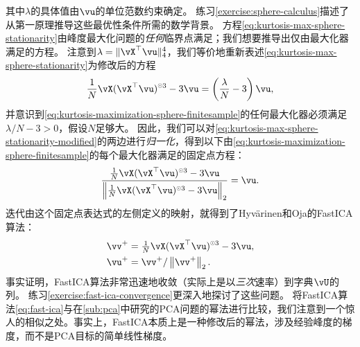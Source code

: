 \documentclass[../../book-main.tex]{subfiles}
\begin{document}
其中$\lambda$的具体值由$\vu$的单位范数约束确定。
练习\ref{exercise:sphere-calculus}描述了从第一原理推导这些最优性条件所需的数学背景。
方程\eqref{eq:kurtosis-max-sphere-stationarity}由峰度最大化问题的\textit{任何}临界点满足；我们想要推导出仅由最大化器满足的方程。
注意到$\lambda = \norm{\vX^\top \vu}_4^4$，我们等价地重新表述\eqref{eq:kurtosis-max-sphere-stationarity}为修改后的方程
\begin{align}\label{eq:kurtosis-max-sphere-stationarity-modified}
   \frac{1}{N}\vX (\vX^\top \vu)^{\hada 3} 
   - 
   3 \vu
   = 
   \left(
   \frac{\lambda}{N} - 3
   \right)
   \vu,
\end{align}
并意识到\eqref{eq:kurtosis-maximization-sphere-finitesample}的任何最大化器必须满足$\lambda / N - 3 > 0$，假设$N$足够大。
因此，我们可以对\eqref{eq:kurtosis-max-sphere-stationarity-modified}的两边进行\textit{归一化}，得到以下由\eqref{eq:kurtosis-maximization-sphere-finitesample}的每个最大化器满足的固定点方程：
\begin{align}\label{eq:kurtosis-max-sphere-fxp}
\frac{
   \frac{1}{N}\vX (\vX^\top \vu)^{\hada 3} 
   - 
   3 \vu
   }{
   \norm*{
   \frac{1}{N}\vX (\vX^\top \vu)^{\hada 3} 
   - 
   3 \vu
   }_2
   }
   =
   \vu.
\end{align}
迭代由这个固定点表达式的左侧定义的映射，就得到了Hyv\"{a}rinen和Oja的FastICA算法\cite{hyvarinen-1997}：
\begin{equation}
\begin{split}\label{eq:fast-ica}
   \vv^+ &= \tfrac{1}{N}\vX (\vX^\top \vu)^{\hada 3}- 3 \vu
   ,  \\
   \vu^+ &= \vv^+ / \norm*{\vv^+}_2.
   \end{split}
\end{equation}
事实证明，FastICA算法非常迅速地收敛（实际上是以\textit{三次}速率）到字典$\vU$的列。
练习\ref{exercise:fast-ica-convergence}更深入地探讨了这些问题。
将FastICA算法\eqref{eq:fast-ica}与在\ref{sub:pca}中研究的PCA问题的幂法进行比较，我们注意到一个惊人的相似之处。事实上，FastICA本质上是一种修改后的幂法，涉及经验峰度的梯度，而不是PCA目标的简单线性梯度。

\end{document}
